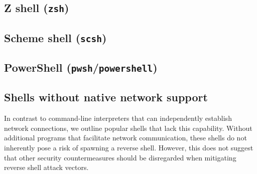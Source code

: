 


\subsection{Z shell (\texttt{zsh})}





\subsection{Scheme shell (\texttt{scsh})}


\subsection{PowerShell (\texttt{pwsh}/\texttt{powershell})}





\subsection{Shells without native network support}

In contrast to command-line interpreters that can independently establish network connections, we outline popular shells that lack this capability. Without additional programs that facilitate network communication, these shells do not inherently pose a risk of spawning a reverse shell. However, this does not suggest that other security countermeasures should be disregarded when mitigating reverse shell attack vectors.

